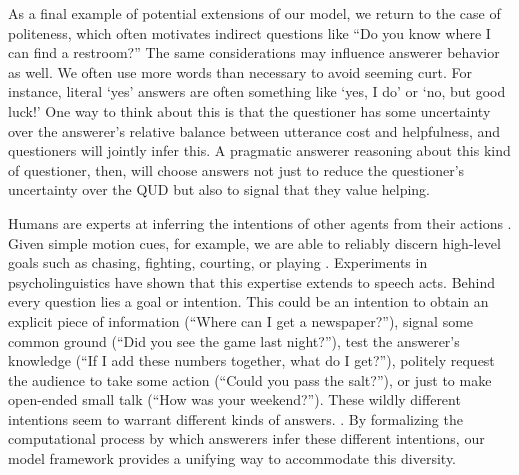 \documentclass[12pt, floatsintext, jou]{apa6}
\begin{document}
As a final example of potential extensions of our model, we return to the case of politeness, which often motivates indirect questions like ``Do you know where I can find a restroom?'' The same considerations may influence answerer behavior as well. We often use more words than necessary to avoid seeming curt. For instance, literal `yes' answers are often something like `yes, I do' or `no, but good luck!' One way to think about this is that the questioner has some uncertainty over the answerer's relative balance between utterance cost and helpfulness, and questioners will jointly infer this. A pragmatic answerer reasoning about this kind of questioner, then, will choose answers not just to reduce the questioner's uncertainty over the QUD but also to signal that they value helping. 


Humans are experts at inferring the intentions of other agents from their actions \cite{TomaselloCarpenter___Moll05_IntentionsCulturalCognition, BakerSaxeTenenbaum09_ActionUnderstandingInversePlanning}. Given simple motion cues, for example, we are able to reliably discern high-level goals such as chasing, fighting, courting, or playing \cite{BarrettToddMillerBlythe05_IntentionFromMotionCues, HeiderSimmel44_Animacy}. Experiments in psycholinguistics have shown that this expertise extends to speech acts.  Behind every question lies a goal or intention. This could be an intention to obtain an explicit piece of information (``Where can I get a newspaper?''), signal some common ground (``Did you see the game last night?''), test the answerer's knowledge (``If I add these numbers together, what do I get?''), politely request the audience to take some action (``Could you pass the salt?''), or just to make open-ended small talk (``How was your weekend?''). These wildly different intentions seem to warrant different kinds of answers.%
. 
By formalizing the computational process by which answerers infer these different intentions, our model framework provides a unifying way to accommodate this diversity.  %




\end{document}
